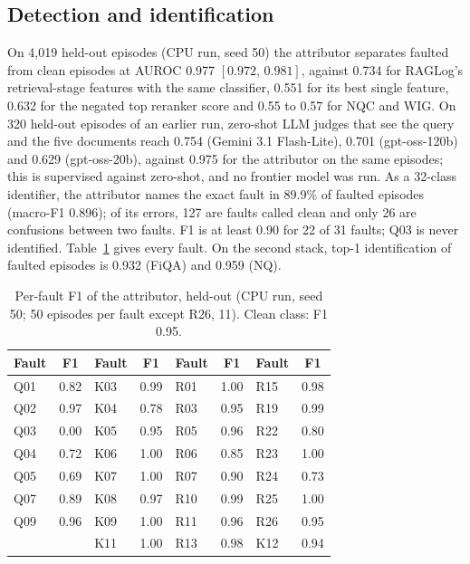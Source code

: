 \documentclass[conference]{IEEEtran}
\newcommand{\ci}[2]{[#1,\,#2]}
\begin{document}
\subsection{Detection and identification}\label{sec:res-diag}
On 4{,}019 held-out episodes (CPU run, seed 50) the attributor separates faulted from clean episodes at AUROC 0.977 $\ci{0.972}{0.981}$, against 0.734 for RAGLog's retrieval-stage features with the same classifier, 0.551 for its best single feature, 0.632 for the negated top reranker score and 0.55 to 0.57 for NQC and WIG. On 320 held-out episodes of an earlier run, zero-shot LLM judges that see the query and the five documents reach 0.754 (Gemini 3.1 Flash-Lite), 0.701 (gpt-oss-120b) and 0.629 (gpt-oss-20b), against 0.975 for the attributor on the same episodes; this is supervised against zero-shot, and no frontier model was run. As a 32-class identifier, the attributor names the exact fault in 89.9\% of faulted episodes (macro-F1 0.896); of its errors, 127 are faults called clean and only 26 are confusions between two faults. F1 is at least 0.90 for 22 of 31 faults; Q03 is never identified. Table~\ref{tab:perfault} gives every fault. On the second stack, top-1 identification of faulted episodes is 0.932 (FiQA) and 0.959 (NQ).

\begin{table}[t]
\caption{Per-fault F1 of the attributor, held-out (CPU run, seed 50; 50 episodes per fault except R26, 11). Clean class: F1 0.95.}
\label{tab:perfault}
\centering\footnotesize
\begin{tabular}{@{}lc@{\hspace{6pt}}lc@{\hspace{6pt}}lc@{\hspace{6pt}}lc@{}}
\toprule
Fault & F1 & Fault & F1 & Fault & F1 & Fault & F1\\
\midrule
Q01 & 0.82 & K03 & 0.99 & R01 & 1.00 & R15 & 0.98\\
Q02 & 0.97 & K04 & 0.78 & R03 & 0.95 & R19 & 0.99\\
Q03 & 0.00 & K05 & 0.95 & R05 & 0.96 & R22 & 0.80\\
Q04 & 0.72 & K06 & 1.00 & R06 & 0.85 & R23 & 1.00\\
Q05 & 0.69 & K07 & 1.00 & R07 & 0.90 & R24 & 0.73\\
Q07 & 0.89 & K08 & 0.97 & R10 & 0.99 & R25 & 1.00\\
Q09 & 0.96 & K09 & 1.00 & R11 & 0.96 & R26 & 0.95\\
    &      & K11 & 1.00 & R13 & 0.98 & K12 & 0.94\\
\bottomrule
\end{tabular}
\end{table}
\end{document}
